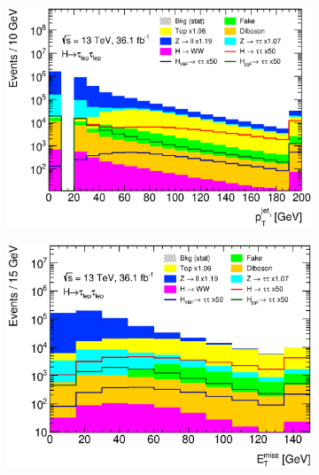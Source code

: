 \begin{figure}[htb]
\begin{subfigure}[t]{0.45\textwidth}
        \includegraphics[width=\textwidth]{./plots/event_selection/presel/ll-CutMVis-JetPt0-log.eps}
        \caption{}\label{fig:event_selection:cutflow:jetlead}
    \end{subfigure}
    \begin{subfigure}[t]{0.45\textwidth}
        \includegraphics[width=\textwidth]{./plots/event_selection/presel/eemm-CutJet0Pt-MET-log.eps}
        \caption{}\label{fig:event_selection:cutflow:metsf}
    \end{subfigure}
    \begin{subfigure}[t]{0.45\textwidth}

\end{subfigure}
\end{figure}
